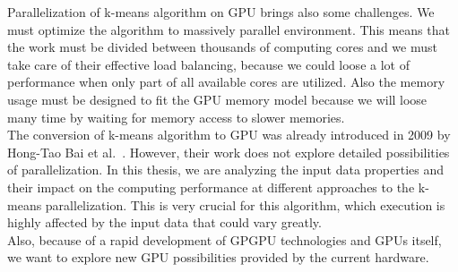 Parallelization of k-means algorithm on GPU brings also some challenges. We must optimize the algorithm to massively parallel environment. This means that the work must be divided between thousands of computing cores and we must take care of their effective load balancing, because we could loose a lot of performance when only part of all available cores are utilized. Also the memory usage must be designed to fit the GPU memory model because we will loose many time by waiting for memory access to slower memories.\\


The conversion of k-means algorithm to GPU was already introduced in 2009 by Hong-Tao Bai et al.~\cite{Hong09}. However, their work does not explore detailed possibilities of parallelization.
In this thesis, we are analyzing the input data properties and their impact on the computing performance at different approaches to the k-means parallelization. This is very crucial for this algorithm, which execution is highly affected by the input data that could vary greatly.\\

Also, because of a rapid development of GPGPU technologies and GPUs itself, we want to explore new GPU possibilities provided by the current hardware.\\



